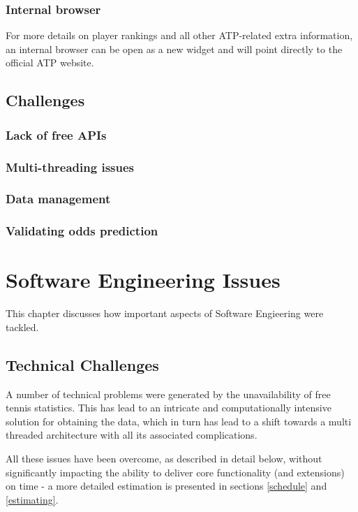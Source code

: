 \documentclass[10pt]{report}
\begin{document}
\subsection {Internal browser}
For more details on player rankings and all other ATP-related extra information, an internal browser can be open as a new widget and will point directly to the official ATP website.

\section{Challenges}
\subsection {Lack of free APIs}
\subsection {Multi-threading issues}
\subsection {Data management}
\subsection {Validating odds prediction}


\chapter{Software Engineering Issues}

This chapter discusses how important aspects of Software Engieering were tackled.

\section{Technical Challenges}

A number of technical problems were generated by the unavailability of free tennis statistics. This has lead to an intricate and computationally intensive solution for obtaining the data, which in turn has lead to a shift towards a multi threaded architecture with all its associated complications.

All these issues have been overcome, as described in detail below, without significantly impacting the ability to deliver core functionality (and extensions) on time - a more detailed estimation is presented in sections \ref{schedule} and  \ref{estimating}.
\end{document}
